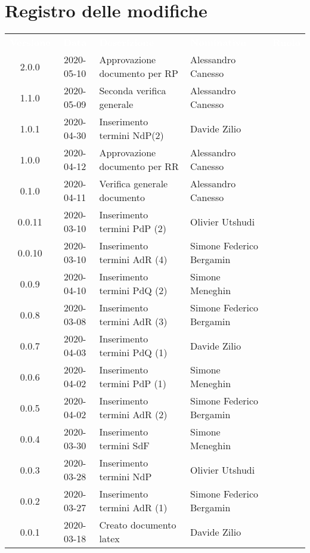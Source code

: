 \section*{Registro delle modifiche}
{
	\centering
	\begin{longtable}{ c c  C{4cm} C{3cm} C{3.5cm} }
		\textcolor{white}{\textbf{Versione}} & \textcolor{white}{\textbf{Data}} & \textcolor{white}{\textbf{Descrizione}} & \textcolor{white}{\textbf{Nominativo}} & \textcolor{white}{\textbf{Ruolo}}\\
		2.0.0 & 2020-05-10 & Approvazione documento per RP & Alessandro Canesso &\RdP{}\\
		1.1.0 & 2020-05-09 & Seconda verifica generale & Alessandro Canesso &\ver{}\\
		1.0.1 & 2020-04-30 & Inserimento termini NdP(2) & Davide Zilio &\ana{} \\
		1.0.0 & 2020-04-12 & Approvazione documento per RR& Alessandro Canesso &\RdP{}\\
		0.1.0 & 2020-04-11 & Verifica generale documento & Alessandro Canesso &\ver{}\\
		0.0.11 & 2020-03-10 & Inserimento termini PdP (2) & Olivier Utshudi &\ana{}\\
		0.0.10 & 2020-03-10 & Inserimento termini AdR (4) & Simone Federico Bergamin &\ana{}\\
		0.0.9 & 2020-04-10 & Inserimento termini PdQ (2) & Simone Meneghin &\ana{}\\
		0.0.8 & 2020-03-08 & Inserimento termini AdR (3) & Simone Federico Bergamin &\ana{}\\
		0.0.7 & 2020-04-03 & Inserimento termini PdQ (1) & Davide Zilio &\ana{}\\
		0.0.6 & 2020-04-02 & Inserimento termini PdP (1) & Simone Meneghin &\ana{}\\
		0.0.5 & 2020-04-02 & Inserimento termini AdR (2) & Simone Federico Bergamin &\ana{}\\
		0.0.4 & 2020-03-30 & Inserimento termini SdF & Simone Meneghin &\ana{}\\
		0.0.3 & 2020-03-28 & Inserimento termini NdP & Olivier Utshudi &\ana{}\\
		0.0.2 & 2020-03-27 & Inserimento termini AdR (1) & Simone Federico Bergamin &\ana{}\\
		0.0.1 & 2020-03-18 & Creato documento latex & Davide Zilio &\ana{}\\		
		
	\end{longtable}

}